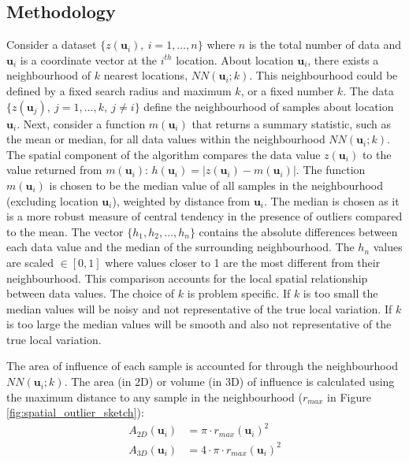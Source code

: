 \subsection{Methodology}
\label{subsec:02methodology}


Consider a dataset $\{z(\mathbf{u}_{i}), \ i = 1, \dots, n\}$ where $n$ is the total number of data and $\mathbf{u}_{i}$ is a coordinate vector at the $i^{th}$ location. About location $\mathbf{u}_{i}$, there exists a neighbourhood of $k$ nearest locations, $NN(\mathbf{u}_{i}; k)$. This neighbourhood could be defined by a fixed search radius and maximum $k$, or a fixed number $k$. The data $\{z(\mathbf{u}_{j}), \ j = 1, \dots, k, \ j \neq i \}$ define the neighbourhood of samples about location $\mathbf{u}_{i}$. Next, consider a function $m(\mathbf{u}_{i})$ that returns a summary statistic, such as the mean or median, for all data values within the neighbourhood $NN(\mathbf{u}_{i}; k)$. The spatial component of the algorithm compares the data value $z(\mathbf{u}_{i})$ to the value returned from $m(\mathbf{u}_{i})$: $h(\mathbf{u}_{i}) = |z(\mathbf{u}_{i}) - m(\mathbf{u}_{i})|$. The function $m(\mathbf{u}_{i})$ is chosen to be the median value of all samples in the neighbourhood (excluding location $\mathbf{u}_{i}$), weighted by distance from $\mathbf{u}_{i}$. The median is chosen as it is a more robust measure of central tendency in the presence of outliers compared to the mean. The vector $\{h_{1}, h_{2}, \dots, h_{n}\}$ contains the absolute differences between each data value and the median of the surrounding neighbourhood. The $h_{n}$ values are scaled $\in [0,1]$ where values closer to 1 are the most different from their neighbourhood. This comparison accounts for the local spatial relationship between data values. The choice of $k$ is problem specific. If $k$ is too small the median values will be noisy and not representative of the true local variation. If $k$ is too large the median values will be smooth and also not representative of the true local variation.

The area of influence of each sample is accounted for through the neighbourhood $NN(\mathbf{u}_{i}; k)$. The area (in \acrshort{2D}) or volume (in \acrshort{3D}) of influence is calculated using the maximum distance to any sample in the neighbourhood ($r_{max}$ in Figure \ref{fig:spatial_outlier_sketch}):
\begin{align}
    A_{2D}(\mathbf{u}_{i}) & = \pi \cdot r_{max}(\mathbf{u}_{i})^{2}         \\
    A_{3D}(\mathbf{u}_{i}) & = 4 \cdot \pi \cdot r_{max}(\mathbf{u}_{i})^{2}
    \label{eq:aoi}
\end{align}

